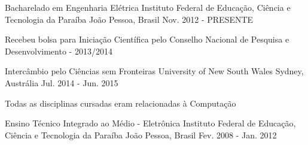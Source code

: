 

\begin{cventries}

  \cventry
    {Bacharelado em Engenharia Elétrica} %
    {Instituto Federal de Educação, Ciência e Tecnologia da Paraíba} %
    {João Pessoa, Brasil} %
    {Nov. 2012 - PRESENTE} %
    {
	\begin{cvitems} %
		\item {Recebeu bolsa para Iniciação Científica pelo Conselho Nacional de Pesquisa e Desenvolvimento - 2013/2014}
	\end{cvitems}
    }
    
    \cventry
    {Intercâmbio pelo Ciências sem Fronteiras} %
    {University of New South Wales} %
    {Sydney, Austrália} %
    {Jul. 2014 - Jun. 2015} %
    {
		\begin{cvitems} %
        	\item {Todas as disciplinas cursadas eram relacionadas à Computação}  
        \end{cvitems} 
    }
    
    \cventry
    {Ensino Técnico Integrado ao Médio - Eletrônica} %
    {Instituto Federal de Educação, Ciência e Tecnologia da Paraíba} %
    {João Pessoa, Brasil} %
    {Fev. 2008 - Jan. 2012} %
    {
    }

\end{cventries}
